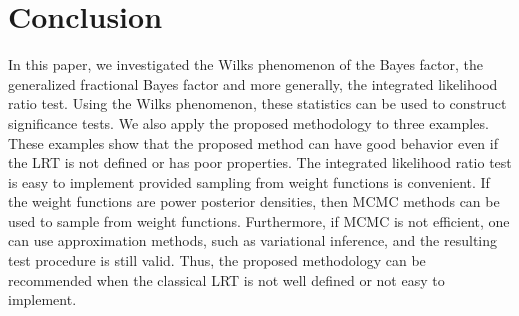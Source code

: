 \documentclass[11pt]{article}
\theoremstyle{plain}
\theoremstyle{definition}
\theoremstyle{remark}
\begin{document}
\section{Conclusion} \label{sec:conclusion}
In this paper, we investigated the Wilks phenomenon of the Bayes factor, the generalized fractional Bayes factor and more generally, the integrated likelihood ratio test.
Using the Wilks phenomenon, these statistics can be used to construct significance tests.
We also apply the proposed methodology to three examples.
These examples show that the proposed method can have good behavior even if the LRT is not defined or has poor properties.
The integrated likelihood ratio test is easy to implement provided sampling from weight functions is convenient.
If the weight functions are power posterior densities, then MCMC methods can be used to sample from weight functions.
Furthermore, if MCMC is not efficient, one can use approximation methods, such as variational inference, and the resulting test procedure is still valid.
Thus, the proposed methodology can be recommended when the classical LRT is not well defined or not easy to implement.








\end{document}
